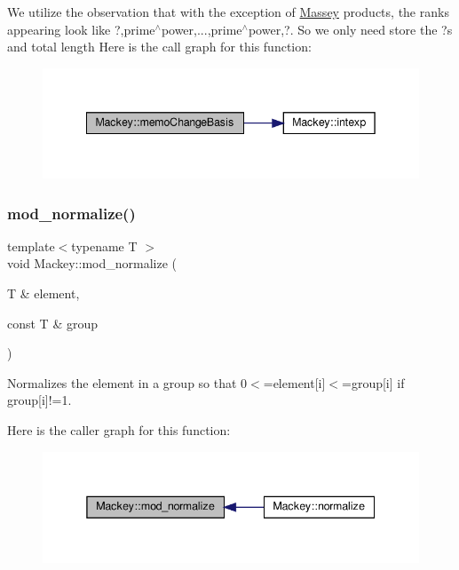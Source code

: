 We utilize the observation that with the exception of \hyperlink{classMackey_1_1Massey}{Massey} products, the ranks appearing look like ?,prime$^\wedge$power,...,prime$^\wedge$power,?. So we only need store the ?\textquotesingle{}s and total length Here is the call graph for this function\+:\nopagebreak
\begin{figure}[H]
\begin{center}
\leavevmode
\includegraphics[width=342pt]{namespaceMackey_a70952d513d08b47bc282441a3e9d732c_cgraph}
\end{center}
\end{figure}
\mbox{\label{namespaceMackey_a257bcf5aabab2d73fdb13a23cb975d93}} 
\subsubsection{\texorpdfstring{mod\+\_\+normalize()}{mod\_normalize()}}
{\footnotesize\ttfamily template$<$typename T $>$ \\
void Mackey\+::mod\+\_\+normalize (\begin{DoxyParamCaption}\item[{T \&}]{element,  }\item[{const T \&}]{group }\end{DoxyParamCaption})}



Normalizes the element in a group so that 0$<$=element\mbox{[}i\mbox{]}$<$=group\mbox{[}i\mbox{]} if group\mbox{[}i\mbox{]}!=1. 

Here is the caller graph for this function\+:\nopagebreak
\begin{figure}[H]
\begin{center}
\leavevmode
\includegraphics[width=338pt]{namespaceMackey_a257bcf5aabab2d73fdb13a23cb975d93_icgraph}
\end{center}
\end{figure}
\mbox{\label{namespaceMackey_a80dbde3a859378ede596b48869ec50d9}} 
